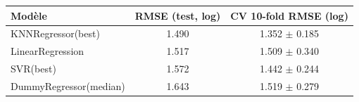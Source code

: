 \begin{tabular}{lcc}
\toprule
Modèle & RMSE (test, log) & CV 10-fold RMSE (log) \\
\midrule
KNNRegressor(best) & 1.490 & 1.352 $\pm$ 0.185 \\
LinearRegression & 1.517 & 1.509 $\pm$ 0.340 \\
SVR(best) & 1.572 & 1.442 $\pm$ 0.244 \\
DummyRegressor(median) & 1.643 & 1.519 $\pm$ 0.279 \\
\bottomrule
\end{tabular}